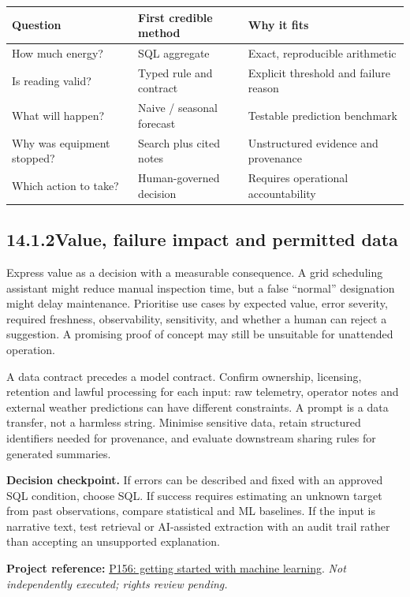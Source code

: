 \documentclass[11pt,twoside]{article}
\newcommand{\topic}[2]{\subsection*{#1\quad #2}}
\newcommand{\repo}[2]{\par\begingroup\fontsize{8.0}{9.6}\selectfont\sffamily\color{inkgray}\textbf{Project reference:} \href{#2}{#1}. \textit{Not independently executed; rights review pending.}\par\endgroup}
\begin{document}
\begin{center}\small\begin{tabularx}{\linewidth}{@{}p{27mm}X X@{}}\toprule
Question & First credible method & Why it fits \\ \midrule
How much energy? & SQL aggregate & Exact, reproducible arithmetic \\
Is reading valid? & Typed rule and contract & Explicit threshold and failure reason \\
What will happen? & Naive / seasonal forecast & Testable prediction benchmark \\
Why was equipment stopped? & Search plus cited notes & Unstructured evidence and provenance \\
Which action to take? & Human-governed decision & Requires operational accountability \\
\bottomrule\end{tabularx}\end{center}
\topic{14.1.2}{Value, failure impact and permitted data}
Express value as a decision with a measurable consequence. A grid scheduling assistant might reduce manual inspection time, but a false ``normal'' designation might delay maintenance. Prioritise use cases by expected value, error severity, required freshness, observability, sensitivity, and whether a human can reject a suggestion. A promising proof of concept may still be unsuitable for unattended operation.

A data contract precedes a model contract. Confirm ownership, licensing, retention and lawful processing for each input: raw telemetry, operator notes and external weather predictions can have different constraints. A prompt is a data transfer, not a harmless string. Minimise sensitive data, retain structured identifiers needed for provenance, and evaluate downstream sharing rules for generated summaries.
\begin{insight}\textbf{Decision checkpoint.} If errors can be described and fixed with an approved SQL condition, choose SQL. If success requires estimating an unknown target from past observations, compare statistical and ML baselines. If the input is narrative text, test retrieval or AI-assisted extraction with an audit trail rather than accepting an unsupported explanation.\end{insight}
\repo{P156: getting started with machine learning}{https://github.com/Snowflake-Labs/sfguide-getting-started-machine-learning}

\newpage
\end{document}
